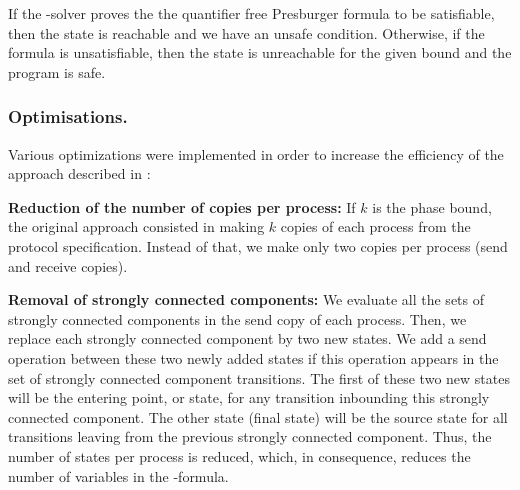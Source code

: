 If the \Smt-solver proves the the quantifier free Presburger formula to be satisfiable,
then the state is reachable and we have an unsafe condition.
Otherwise, if the formula is unsatisfiable, then the state is unreachable for the given bound and the program is safe.


\subsubsection*{Optimisations.}
Various optimizations were implemented in order to increase the efficiency of the approach described in  \cite{AAC13}:

\begin{description}
\item{\textbf{Reduction of the number of copies per process:}}
If $k$ is the phase bound, the original approach consisted in making $k$ copies of each process from the protocol specification.
Instead of that, we make only two copies per process (send and receive copies).
%
\item{\textbf{Removal of strongly connected components:}}
We evaluate all the sets of strongly connected components in the send copy of each process. 
Then, we replace each strongly connected component by two new states.
We add a send operation between these two newly added states if this operation appears in the set of strongly connected component transitions.
The first of these two new states will be the entering point, or state, for any transition inbounding this strongly connected component.
The other state (final state) will be  the source state for all transitions leaving from the previous strongly connected component.
Thus, the number of states per process is reduced, which, in consequence, reduces the number of variables in the \Smt-formula.
\end{description}
